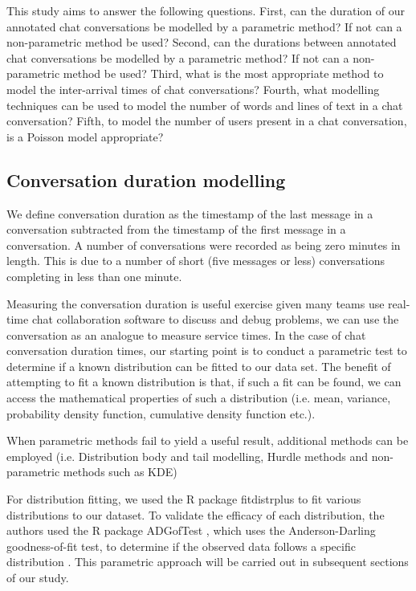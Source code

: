 \documentclass[conference]{IEEEtran}
\begin{document}
This study aims to answer the following questions. First, can the duration of our annotated chat conversations be modelled by a parametric method? If not can a non-parametric method be used? Second, can the durations between annotated chat conversations be modelled by a parametric method? If not can a non-parametric method be used? Third, what is the most appropriate method to model the inter-arrival times of chat conversations? Fourth, what modelling techniques can be used to model the number of words and lines of text in a chat conversation? Fifth, to model the number of users present in a chat conversation, is a Poisson model appropriate?

\subsection{Conversation duration modelling}

We define conversation duration as the timestamp of the last message in a conversation subtracted from the timestamp of the first message in a conversation. A number of conversations were recorded as being zero minutes in length. This is due to a number of short (five messages or less) conversations completing in less than one minute. 


Measuring the conversation duration is useful exercise given many teams use real-time chat collaboration software to discuss and debug problems, we can use the conversation as an analogue to measure service times. In the case of chat conversation duration times, our starting point is to conduct a parametric test to determine if a known distribution can be fitted to our data set. The benefit of attempting to fit a known distribution is that, if such a fit can be found, we can access the mathematical properties of such a distribution (i.e. mean, variance, probability density function, cumulative density function etc.). 

When parametric methods fail to yield a useful result, additional methods can be employed (i.e. Distribution body and tail modelling, Hurdle methods and non-parametric methods such as KDE)

For distribution fitting, we used the R package fitdistrplus \cite{fitdistrplus} to fit various distributions to our dataset. To validate the efficacy of each distribution,  the authors used the R package ADGofTest \cite{ADGoF}, which uses the Anderson-Darling goodness-of-fit test, to determine if the observed data follows a specific distribution \cite {anderson1952asymptotic}. This parametric approach will be carried out in subsequent sections of our study.
\end{document}
